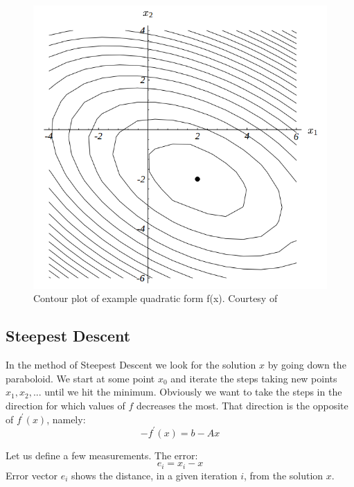 \documentclass[en]{minipw} %
\begin{document}
\begin{figure}[h!]
\centering
\includegraphics[scale=0.5]{pictures/contour.png}
\caption[Contour plot of quadratic form]{Contour plot of example quadratic form f(x). Courtesy of~\cite{cg}}
\end{figure}

\subsection{Steepest Descent}
In the method of Steepest Descent we look for the solution $x$ by going down the paraboloid. We start at some point $x_0$ and iterate the steps taking new points $x_1, x_2 ,...$ until we hit the minimum. Obviously we want to take the steps in the direction for which values of $f$ decreases the most. That direction is the opposite of $f^{'}(x)$, namely:
\begin{equation}
\label{eq:gradient_minus}
-f^{'}(x) = b - Ax
\end{equation}

Let us define a few measurements. The error:
\begin{equation}
e_i = x_i - x
\end{equation}
Error vector $e_i$ shows the distance, in a given iteration $i$, from the solution $x$.
\end{document}
